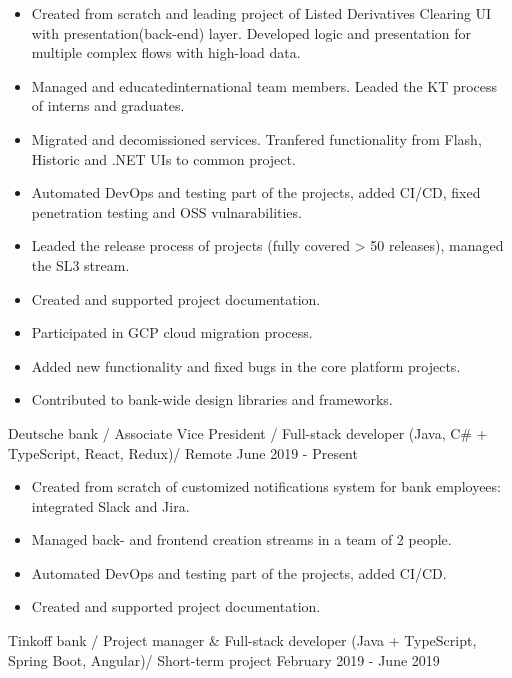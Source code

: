 

\vspace{0cm}\begin{cventries}
\cventry
{
\vspace{-0.4cm}
\begin{itemize}
\item Created from scratch and leading project of Listed Derivatives Clearing UI with presentation(back-end) layer. Developed logic and presentation for multiple complex flows with high-load data.
\item Managed and educatedinternational team members. Leaded the KT process of interns and graduates.
\item Migrated and decomissioned services. Tranfered functionality from Flash, Historic and .NET UIs to common project. 
\item Automated DevOps and testing part of the projects, added CI/CD, fixed penetration testing and OSS vulnarabilities. 
\item Leaded the release process of projects (fully covered > 50 releases), managed the SL3 stream.
\item Created and supported project documentation.
\item Participated in GCP cloud migration process.
\item Added new functionality and fixed bugs in the core platform projects.
\item Contributed to bank-wide design libraries and frameworks.
\end{itemize}
} %
{Deutsche bank / Associate Vice President / Full-stack developer (Java, C\# + TypeScript, React, Redux)/ Remote} %
{} %
{June 2019 - Present} %
\noindent	

\vspace{-0.4cm}
\cventry
{
\vspace{-0.4cm}
\begin{itemize}
\item Created from scratch of customized notifications system for bank employees: integrated Slack and Jira.
\item Managed back- and frontend creation streams in a team of 2 people.
\item Automated DevOps and testing part of the projects, added CI/CD. 
\item Created and supported project documentation.
\end{itemize}
} %
{Tinkoff bank / Project manager \& Full-stack developer (Java + TypeScript, Spring Boot, Angular)/ Short-term project} %
{} %
{February 2019 - June 2019} %
\noindent	


\end{cventries}
